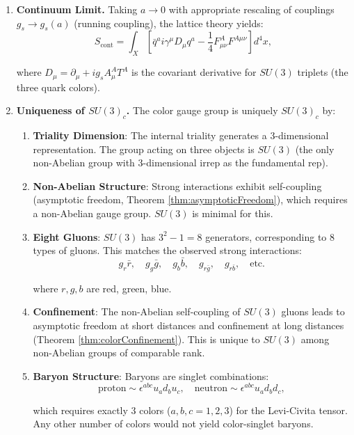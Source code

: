 \begin{enumerate}
introduce gauge fields $A_{n,\mu}^A$ ($A = 1, \ldots, 8$ for the 8 generators of $SU(3)$) via:
\begin{equation}
U_{n,\mu} = e^{i g_s A_{n,\mu}}, \quad A_{n,\mu} = \sum_A A_{n,\mu}^A T^A.
\end{equation}

\item \textbf{Continuum Limit.} Taking $a \to 0$ with appropriate rescaling of couplings $g_s \to g_s(a)$ (running coupling), the lattice theory yields:
\begin{equation}
S_{\text{cont}} = \int_X \left[\bar{q}^a i\gamma^\mu D_\mu q^a - \frac{1}{4}F_{\mu\nu}^A F^{A\mu\nu}\right] d^4x,
\end{equation}

where $D_\mu = \partial_\mu + ig_s A_\mu^A T^A$ is the covariant derivative for $SU(3)$ triplets (the three quark colors).

\item \textbf{Uniqueness of $SU(3)_c$.} The color gauge group is uniquely $SU(3)_c$ by:

\begin{enumerate}[label=(\roman*)]
\item \textbf{Triality Dimension}: The internal triality generates a 3-dimensional representation. The group acting on three objects is $SU(3)$ (the only non-Abelian group with 3-dimensional irrep as the fundamental rep).

\item \textbf{Non-Abelian Structure}: Strong interactions exhibit self-coupling (asymptotic freedom, Theorem \ref{thm:asymptoticFreedom}), which requires a non-Abelian gauge group. $SU(3)$ is minimal for this.

\item \textbf{Eight Gluons}: $SU(3)$ has $3^2 - 1 = 8$ generators, corresponding to 8 types of gluons. This matches the observed strong interactions:
\begin{equation}
g_r \bar{r}, \quad g_g \bar{g}, \quad g_b \bar{b}, \quad g_{r\bar{g}}, \quad g_{r\bar{b}}, \quad \text{etc.}
\end{equation}

where $r, g, b$ are red, green, blue.

\item \textbf{Confinement}: The non-Abelian self-coupling of $SU(3)$ gluons leads to asymptotic freedom at short distances and confinement at long distances (Theorem \ref{thm:colorConfinement}). This is unique to $SU(3)$ among non-Abelian groups of comparable rank.

\item \textbf{Baryon Structure}: Baryons are singlet combinations:
\begin{equation}
\text{proton} \sim \epsilon^{abc} u_a d_b u_c, \quad \text{neutron} \sim \epsilon^{abc} u_a d_b d_c,
\end{equation}

which requires exactly 3 colors ($a, b, c = 1, 2, 3$) for the Levi-Civita tensor. Any other number of colors would not yield color-singlet baryons.
\end{enumerate}

\end{enumerate}

